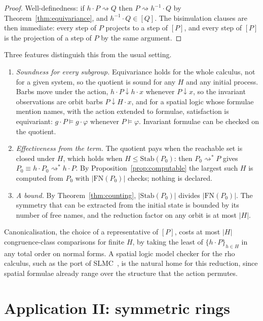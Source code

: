\documentclass[11pt]{article}
\theoremstyle{definition}
\theoremstyle{remark}
\newcommand{\act}[2]{#1\cdot #2}
\newcommand{\red}{\rightsquigarrow}
\newcommand{\scong}{\equiv}
\newcommand{\FN}{\mathrm{FN}}
\newcommand{\Stab}{\mathrm{Stab}}
\begin{document}
\begin{proof}
Well-definedness: if $\act{h}{P}\red Q$ then $P\red\act{h^{-1}}{Q}$ by
Theorem~\ref{thm:equivariance}, and $\act{h^{-1}}{Q}\in[Q]$. The bisimulation
clauses are then immediate: every step of $P$ projects to a step of $[P]$, and
every step of $[P]$ is the projection of a step of $P$ by the same argument.
\end{proof}

Three features distinguish this from the usual setting.

\begin{enumerate}[leftmargin=1.5em]
\item \emph{Soundness for every subgroup.} Equivariance holds for the whole
  calculus, not for a given system, so the quotient is sound for any $H$ and
  any initial process. Barbs move under the action, $\act{h}{P}\downarrow
  \act{h}{x}$ whenever $P\downarrow x$, so the invariant observations are
  orbit barbs $P\downarrow H{\cdot}x$, and for a spatial logic whose formulae mention names, with the action extended
  to formulae, satisfaction is equivariant: $\act{g}{P}\models\act{g}{\varphi}$
  whenever $P\models\varphi$. Invariant formulae can be checked on the quotient.
\item \emph{Effectiveness from the term.} The quotient pays when the
  reachable set is closed under $H$, which holds when $H\le\Stab(P_0)$: then
  $P_0\red^*P$ gives $P_0\scong\act{h}{P_0}\red^*\act{h}{P}$. By
  Proposition~\ref{prop:computable} the largest such $H$ is computed from
  $P_0$ with $|\FN(P_0)|$ checks; nothing is declared.
\item \emph{A bound.} By Theorem~\ref{thm:counting}, $|\Stab(P_0)|$ divides
  $|\FN(P_0)|$. The symmetry that can be extracted from the initial state is
  bounded by its number of free names, and the reduction factor on any orbit
  is at most $|H|$.
\end{enumerate}

Canonicalisation, the choice of a representative of $[P]$, costs at most
$|H|$ congruence-class comparisons for finite $H$, by taking the least of
$\{\act{h}{P}\}_{h\in H}$ in any total order on normal forms. A spatial logic
model checker for the rho calculus, such as the port of SLMC~\cite{slmc}, is
the natural home for this reduction, since spatial formulae already range over
the structure that the action permutes.

\section{Application II: symmetric rings}\label{sec:rings}
\end{document}
